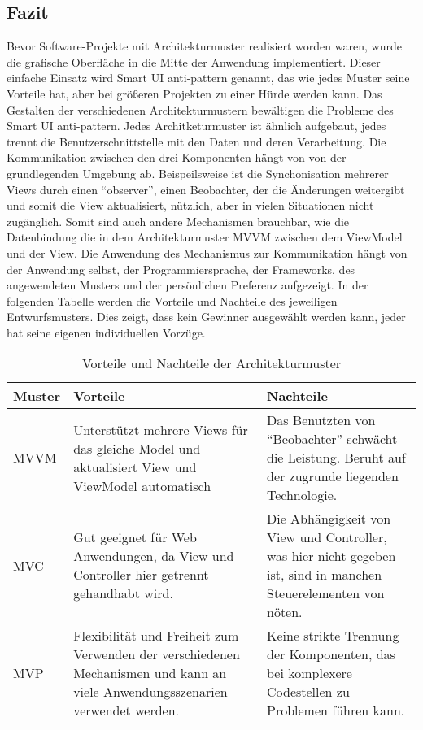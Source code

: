 \subsection{Fazit}
Bevor Software-Projekte mit Architekturmuster realisiert worden waren, wurde die grafische Oberfl\"ache in die Mitte der Anwendung implementiert. Dieser einfache Einsatz wird Smart UI anti-pattern genannt, das wie jedes Muster seine Vorteile hat, aber bei gr\"o\ss{}eren Projekten zu einer H\"urde werden kann. Das Gestalten der verschiedenen Architekturmustern bew\"altigen die Probleme des Smart UI anti-pattern. Jedes Architketurmuster ist \"ahnlich aufgebaut, jedes trennt die Benutzerschnittstelle mit den Daten und deren Verarbeitung. Die Kommunikation zwischen den drei Komponenten h\"angt von von der grundlegenden Umgebung ab. Beispeilsweise ist die Synchonisation mehrerer Views durch einen \enquote{observer}, einen Beobachter, der die \"Anderungen weitergibt und somit die View aktualisiert, n\"utzlich, aber in vielen Situationen nicht zug\"anglich. Somit sind auch andere Mechanismen brauchbar, wie die Datenbindung die in dem Architekturmuster \ac{MVVM} zwischen dem ViewModel und der View. Die Anwendung des Mechanismus zur Kommunikation h\"angt von der Anwendung selbst, der Programmiersprache, der Frameworks, des angewendeten Musters und der pers\"onlichen Preferenz aufgezeigt\cite{Bragge2013}. In der folgenden Tabelle\cite{Syromiatnikov2014} werden die Vorteile und Nachteile des jeweiligen Entwurfsmusters. Dies zeigt, dass kein Gewinner ausgew\"ahlt werden kann, jeder hat seine eigenen individuellen Vorz\"uge.
\begin{table}[h]
\centering
\caption{Vorteile und Nachteile der Architekturmuster}
\label{ProConsPattern}
\begin{tabular}{p{2cm}p{7cm}p{7cm}}
\toprule
Muster & Vorteile & Nachteile \\ \midrule
\ac{MVVM}              
& Unterst\"utzt mehrere Views f\"ur das gleiche Model und aktualisiert View und ViewModel automatisch
& 
Das Benutzten von \enquote{Beobachter} schw\"acht die Leistung. Beruht auf der zugrunde liegenden Technologie.  \\ \hline
\ac{MVC}     
 & 
Gut geeignet f\"ur Web Anwendungen, da View und Controller hier getrennt gehandhabt wird.
 &
 Die Abh\"angigkeit von View und Controller, was hier nicht gegeben ist, sind in manchen Steuerelementen von n\"oten.  \\ \hline
\ac{MVP}            
&
Flexibilit\"at und Freiheit zum Verwenden der verschiedenen Mechanismen und kann an viele Anwendungsszenarien verwendet werden. 
&
Keine strikte Trennung der Komponenten, das bei komplexere Codestellen zu Problemen f\"uhren kann.  
\\ \bottomrule
\end{tabular}
\end{table}

